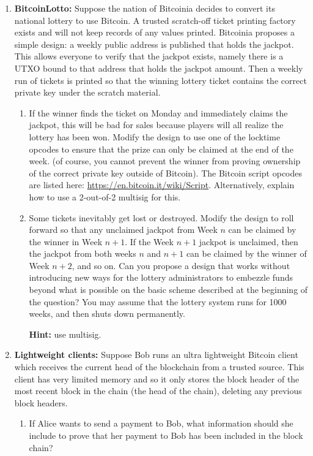 \documentclass[11pt]{article}
\newenvironment{problems}
{\begin{enumerate}[label=\bfseries Problem \arabic*.,align=left,leftmargin=1em,labelwidth=1.5em]}
{\end{enumerate}}
\newenvironment{subparts}
{\begin{enumerate}[label=\bfseries \alph*.,align=right,leftmargin=1.5em]}
{\end{enumerate}}
\begin{document}
\begin{problems}
\item {\bf BitcoinLotto:} 
  Suppose the nation of Bitcoinia decides to convert its national
  lottery to use Bitcoin. A trusted scratch-off ticket printing
  factory exists and will not keep records of any values
  printed. Bitcoinia proposes a simple design: 
  a weekly public address is published that holds the jackpot.
  This allows everyone to verify that the jackpot exists, namely
  there is a UTXO bound to that address that holds the jackpot amount. 
  Then a weekly run of tickets is printed
  so that the winning lottery ticket contains the correct private key 
  under the scratch material.
\begin{subparts}
\item If the winner finds the ticket on Monday and immediately claims
  the jackpot, this will be bad for sales because players will all
  realize the lottery has been won. Modify the design to use
  one of the locktime opcodes to ensure that the prize can only
  be claimed at the end of the week. 
  (of course, you cannot prevent the winner from proving ownership of
  the correct private key outside of Bitcoin).  
  The Bitcoin script opcodes are listed here: 
  \url{https://en.bitcoin.it/wiki/Script}.
  Alternatively, explain how to use a 2-out-of-2 multisig for this.

\item Some tickets inevitably get lost or destroyed.  Modify the
  design to roll forward so that any unclaimed jackpot from Week $n$ 
  can be claimed by the winner in Week $n+1$. 
  If the Week $n+1$ jackpot is unclaimed, then
  the jackpot from both weeks $n$ and $n+1$ can be claimed by the 
  winner of Week $n+2$, and so on.  Can you propose a design that
  works without introducing new ways for the lottery administrators to
  embezzle funds beyond what is possible on the basic scheme
  described at the beginning of the question?  
  You may assume that the lottery system runs for 1000 weeks, and then shuts
  down permanently. 

 {\bf Hint:} use multisig.

\end{subparts}


\vspace{5mm}

\item {\bf Lightweight clients:} Suppose Bob runs an ultra lightweight
  Bitcoin client which receives the current head of the blockchain from a
  trusted source. This client has very limited memory and so it only
  stores the block header of the most recent block
  in the chain (the head of the chain), deleting any previous block headers.
\begin{subparts}
\item If Alice wants to send a payment to Bob, what information should
  she include to prove that her payment to Bob has been included in
  the block chain?


\end{subparts}
\end{problems}
\end{document}
